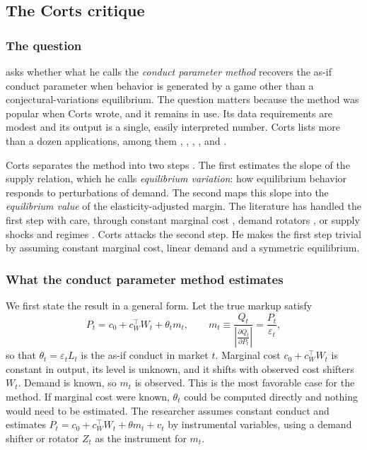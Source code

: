 \subsection{The Corts critique}\label{sec:03-corts}

\subsubsection{The question}

\citet{Corts1999} asks whether what he calls the \emph{conduct parameter method} recovers the as-if conduct parameter when
behavior is generated by a game other than a conjectural-variations equilibrium. The question matters because the method
was popular when Corts wrote, and it remains in use. Its data requirements are modest and its output is a single, easily interpreted number. Corts
lists more than a dozen applications, among them \citet{Iwata1974}, \citet{Appelbaum1982}, \citet{Porter1983},
\citet{Roberts1984}, \citet{SpillerFavaro1984} and \citet{Ellison1994}.

Corts separates the method into two steps \citep[p.~229]{Corts1999}. The first estimates the slope of the supply
relation, which he calls \emph{equilibrium variation}: how equilibrium behavior responds to perturbations of demand. The
second maps this slope into the \emph{equilibrium value} of the elasticity-adjusted margin. The literature has handled the
first step with care, through constant marginal cost \citep{Iwata1974}, demand rotators \citep{Bresnahan1982,Lau1982}, or
supply shocks and regimes \citep{Porter1983}. Corts attacks the second step. He makes the first step trivial by assuming
constant marginal cost, linear demand and a symmetric equilibrium.

\subsubsection{What the conduct parameter method estimates}

We first state the result in a general form. Let the true markup satisfy
\begin{equation}\label{eq:03-corts-markup}
P_t = c_0 + c_W^\top W_t + \theta_t m_t, \qquad m_t \equiv \frac{Q_t}{\left\lvert \frac{\partial Q_t}{\partial P_t}\right\rvert} =
\frac{P_t}{\varepsilon_t},
\end{equation}
so that $\theta_t = \varepsilon_t L_t$ is the as-if conduct in market $t$. Marginal cost $c_0 + c_W^\top W_t$ is
constant in output, its level is unknown, and it shifts with observed cost shifters $W_t$. Demand is known, so $m_t$ is
observed. This is the most favorable case for the method. If marginal cost were known, $\theta_t$ could be computed
directly and nothing would need to be estimated. The researcher assumes constant conduct and estimates
$P_t = c_0 + c_W^\top W_t + \theta m_t + v_t$ by instrumental variables, using a demand shifter or rotator $Z_t$ as the
instrument for $m_t$.

